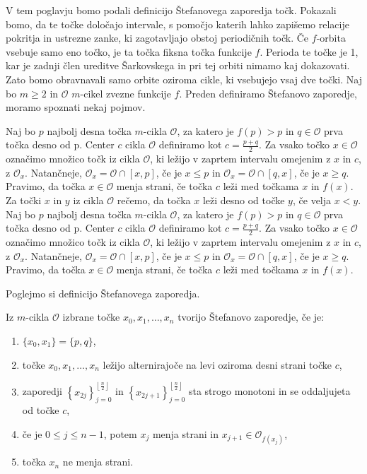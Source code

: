 \documentclass[../TG_magistrsko_delo_sections.tex]{subfiles}
\begin{document}
V tem poglavju bomo podali definicijo Štefanovega zaporedja točk. Pokazali bomo, da te točke določajo intervale, s pomočjo katerih lahko zapišemo relacije pokritja in ustrezne zanke, ki zagotavljajo obstoj periodičnih točk. 
Če $f$-orbita vsebuje samo eno točko, je ta točka fiksna točka funkcije $f$. Perioda te točke je 1, kar je zadnji člen ureditve Šarkovskega in pri tej orbiti nimamo kaj dokazovati. Zato bomo obravnavali samo orbite oziroma cikle, ki vsebujejo vsaj dve točki. Naj bo $m \geq 2$ in $\mathcal{O}$ $m$-cikel zvezne funkcije $f$. Preden definiramo Štefanovo zaporedje, moramo spoznati nekaj pojmov. 

\begin{definicija}
Naj bo $p$ najbolj desna točka $m$-cikla $\mathcal{O}$, za katero je $f(p) > p$ in $q\in \mathcal{O}$ prva točka desno od p. Center $c$ cikla $\mathcal{O}$ definiramo kot $c=\frac{p+q}{2}$. Za vsako točko $x \in \mathcal{O}$ označimo množico točk iz cikla $\mathcal{O}$, ki ležijo v zaprtem intervalu omejenim z $x$ in $c$, z $\mathcal{O}_x$. Natančneje, $\mathcal{O}_x = \mathcal{O} \cap [x, p]$, če je $x \leq p$ in  $\mathcal{O}_x = \mathcal{O} \cap [q, x]$, če je $x \geq q$. Pravimo, da točka $x \in \mathcal{O}$ menja strani, če točka $c$ leži med točkama $x$ in $f(x)$.
Za točki $x$ in $y$ iz cikla $\mathcal{O}$  rečemo, da točka $x$ leži desno od točke $y$, če velja $x < y$. Naj bo $p$ najbolj desna točka $m$-cikla $\mathcal{O}$, za katero je $f(p) > p$ in $q\in \mathcal{O}$ prva točka desno od p. Center $c$ cikla $\mathcal{O}$ definiramo kot $c=\frac{p+q}{2}$. Za vsako točko $x \in \mathcal{O}$ označimo množico točk iz cikla $\mathcal{O}$, ki ležijo v zaprtem intervalu omejenim z $x$ in $c$, z $\mathcal{O}_x$. Natančneje, $\mathcal{O}_x = \mathcal{O} \cap [x, p]$, če je $x \leq p$ in  $\mathcal{O}_x = \mathcal{O} \cap [q, x]$, če je $x \geq q$. Pravimo, da točka $x \in \mathcal{O}$ menja strani, če točka $c$ leži med točkama $x$ in $f(x)$.
\end{definicija}
Poglejmo si definicijo Štefanovega zaporedja.

\begin{definicija}\label{def:stef}
Iz $m$-cikla $\mathcal{O}$ izbrane točke $x_0, x_1, \dots, x_n$ tvorijo Štefanovo zaporedje, če je:

\begin{enumerate}[label={(Š\arabic*)}]\label{def:stef-zap}
    \item $\{x_0, x_1\} = \{p, q\}$, \label{eq:š1}
    \item točke $x_0, x_1, \dots, x_n$ ležijo alternirajoče na levi oziroma desni strani točke $c$, \label{eq:š2}
    \item zaporedji 
    $\left \{ x_{2j} \right \}_{j=0}^{\left \lfloor \frac{n}{2} \right \rfloor}$ 
    in
    $\left \{ x_{2j+1} \right \}_{j=0}^{\left \lfloor \frac{n}{2} \right \rfloor}$ sta strogo monotoni in se oddaljujeta od točke $c$, \label{eq:š3}
    \item če je $0\leq j \leq n-1$, potem $x_j$ menja strani in $x_{j+1} \in \mathcal{O}_{f(x_j)}$,\label{eq:š4}
    \item točka $x_n$ ne menja strani. \label{eq:š5}
\end{enumerate}
\end{definicija}
\end{document}

